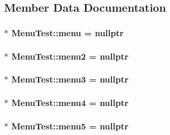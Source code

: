\subsection{Member Data Documentation}
\hypertarget{classMenuTest_a1112471b20626234fa45958cce6ed8d5}{
\subsubsection[{menu}]{$\ast$ Menu\-Test\-::menu = nullptr\hspace{0.3cm}{\ttfamily [private]}}}\label{classMenuTest_a1112471b20626234fa45958cce6ed8d5}
\hypertarget{classMenuTest_a9d994a71bc3d2d182f63030492aeb84d}{
\subsubsection[{menu2}]{$\ast$ Menu\-Test\-::menu2 = nullptr\hspace{0.3cm}{\ttfamily [private]}}}\label{classMenuTest_a9d994a71bc3d2d182f63030492aeb84d}
\hypertarget{classMenuTest_aa0b6345a277c369961506cc226348980}{
\subsubsection[{menu3}]{$\ast$ Menu\-Test\-::menu3 = nullptr\hspace{0.3cm}{\ttfamily [private]}}}\label{classMenuTest_aa0b6345a277c369961506cc226348980}
\hypertarget{classMenuTest_ae9fc6704685a65a231a808bba2f084bb}{
\subsubsection[{menu4}]{$\ast$ Menu\-Test\-::menu4 = nullptr\hspace{0.3cm}{\ttfamily [private]}}}\label{classMenuTest_ae9fc6704685a65a231a808bba2f084bb}
\hypertarget{classMenuTest_a3168d728cd24da638261f21ae954b553}{
\subsubsection[{menu5}]{$\ast$ Menu\-Test\-::menu5 = nullptr\hspace{0.3cm}{\ttfamily [private]}}}\label{classMenuTest_a3168d728cd24da638261f21ae954b553}
